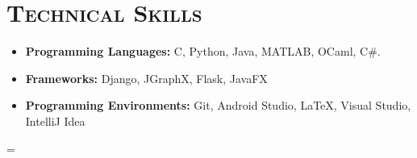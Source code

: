 \documentclass{article}
\newenvironment{longversion}{}{} %
\newenvironment{absolutelynopagebreak}
  {\par\nobreak\vfil\penalty0\vfilneg
   \vtop\bgroup}
  {\par\xdef\tpd{\the\prevdepth}\egroup
   \prevdepth=\tpd}
\newcommand{\CPP}
{C\nolinebreak[4]\hspace{-.05em}\raisebox{.22ex}{\footnotesize\bf ++}}
\newcommand{\tmpsection}[1]{}
\let\tmpsection=\section
\renewcommand{\section}[1]{\tmpsection*{\textsc{#1}}}
\begin{document}
\begin{absolutelynopagebreak}
\begin{itemize}
\end{itemize}


\begin{longversion}
\section{Technical Skills}\begin{itemize}
\item \textbf{Programming Languages:}  \CPP, Python, Java, MATLAB, OCaml, C\#.
\item \textbf{Frameworks:} Django, JGraphX, Flask, JavaFX
\item \textbf{Programming Environments:} Git, Android Studio, LaTeX, Visual Studio, IntelliJ Idea

\end{itemize}

\end{longversion}


\end{absolutelynopagebreak}
\end{document}
